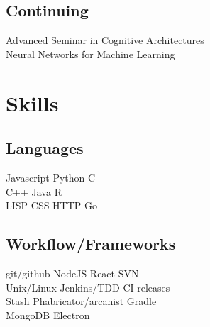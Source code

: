 \documentclass[]{csaund_resume-openfont}
\begin{document}
\begin{minipage}[t]{0.30\textwidth}
\subsection{Continuing}
Advanced Seminar in Cognitive Architectures \\
Neural Networks for Machine Learning 


\section{Skills}
\subsection{Languages}
Javascript \textbullet{} Python \textbullet{} C \\
C++ \textbullet{} Java  \textbullet{} R \\
LISP \textbullet{} CSS \textbullet{} HTTP \textbullet{} Go \\
\vspace{\topsep} %
\subsection{Workflow/Frameworks}
git/github \textbullet{} NodeJS  \textbullet{} React \textbullet{} SVN \textbullet{} \\
 Unix/Linux \textbullet{} Jenkins/TDD \textbullet{} CI releases \\
 Stash \textbullet{} Phabricator/arcanist \textbullet{} Gradle \\
 MongoDB \textbullet{} Electron 
\sectionsep

%
%

\end{minipage}
\hfill
\end{document}
